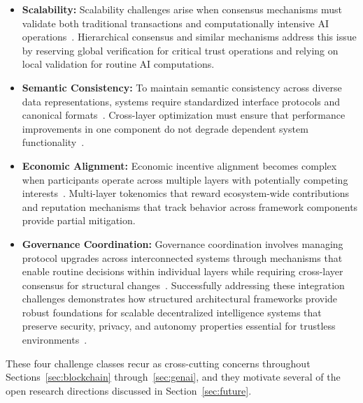\documentclass[5p,twocolumn]{elsarticle}
\begin{document}
\begin{itemize}

\item \textbf{Scalability:} Scalability challenges arise when consensus mechanisms must validate both traditional transactions and computationally intensive AI operations~\cite{thong2025know,feng2025efficient}. Hierarchical consensus and similar mechanisms address this issue by reserving global verification for critical trust operations and relying on local validation for routine AI computations.

\item \textbf{Semantic Consistency:} To maintain semantic consistency across diverse data representations, systems require standardized interface protocols and canonical formats~\cite{far2024third}. Cross-layer optimization must ensure that performance improvements in one component do not degrade dependent system functionality~\cite{wan2024web3}.

\item \textbf{Economic Alignment:} Economic incentive alignment becomes complex when participants operate across multiple layers with potentially competing interests~\cite{qian2024alibaba}. Multi-layer tokenomics that reward ecosystem-wide contributions and reputation mechanisms that track behavior across framework components provide partial mitigation.

\item \textbf{Governance Coordination:} Governance coordination involves managing protocol upgrades across interconnected systems through mechanisms that enable routine decisions within individual layers while requiring cross-layer consensus for structural changes~\cite{christiano2017deep,ziegler2019fine}. Successfully addressing these integration challenges demonstrates how structured architectural frameworks provide robust foundations for scalable decentralized intelligence systems that preserve security, privacy, and autonomy properties essential for trustless environments~\cite{dorri2018multi}.

\end{itemize}

These four challenge classes recur as cross-cutting concerns throughout Sections~\ref{sec:blockchain} through~\ref{sec:genai}, and they motivate several of the open research directions discussed in Section~\ref{sec:future}.
\end{document}
